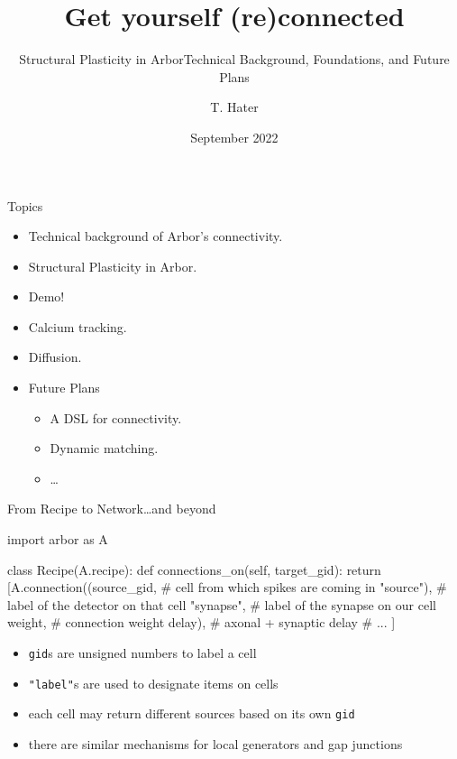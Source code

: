\documentclass{beamer}
\author{T. Hater}
\institute{Forschungszentrum J\"ulich}
\title{Get yourself (re)connected}
\subtitle{Structural Plasticity in Arbor\newline{}\small{Technical Background, Foundations, and Future Plans}}
\date{September 2022}
\begin{document}
\maketitle

\begin{frame}{Topics}
  \begin{itemize}
    \item Technical background of Arbor's connectivity.
    \item Structural Plasticity in Arbor.
    \item Demo!
    \item Calcium tracking.
    \item Diffusion.
    \item Future Plans
          \begin{itemize}
            \item A DSL for connectivity.
            \item Dynamic matching.
            \item \dots
          \end{itemize}
  \end{itemize}
\end{frame}

\begin{frame}[fragile]{From Recipe to Network}{\dots and beyond}
\begin{codePythonblock}
import arbor as A

class Recipe(A.recipe):
    def connections_on(self, target_gid):
        return [A.connection((source_gid,   # cell from which spikes are coming in
                              "source"),    # label of the detector on that cell
                             "synapse",     # label of the synapse on our cell
                             weight,        # connection weight
                             delay),        # axonal + synaptic delay
                # ...
                ]
\end{codePythonblock}
\begin{itemize}
  \item \texttt{gid}s are unsigned numbers to label a cell
  \item \texttt{"label"}s are used to designate items on cells
  \item each cell may return different sources based on its own \texttt{gid}
  \item there are similar mechanisms for local generators and gap junctions
\end{itemize}
\end{frame}
\end{document}
